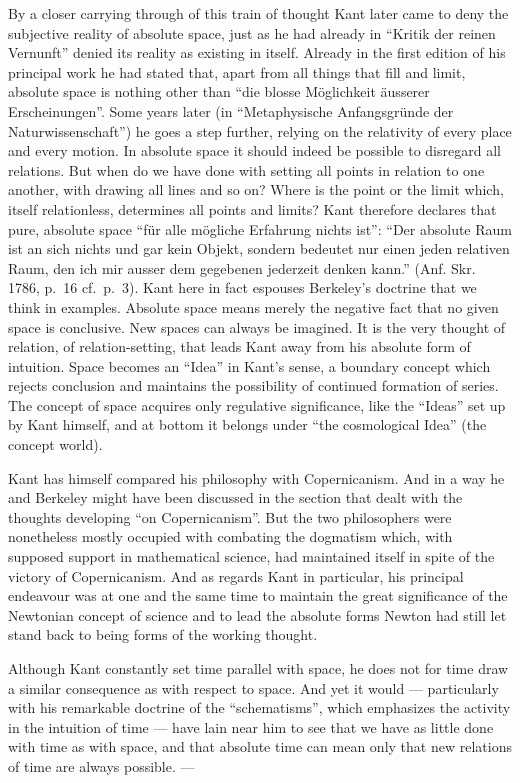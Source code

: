 \documentclass[12pt]{article}
\newcommand{\opage}[1]{\marginnote{\footnotesize\textit{[#1]}}}
\begin{document}
By a closer carrying through of this train of thought Kant later came to
deny the subjective reality of absolute space, just as he had already in
``Kritik der reinen Vernunft'' denied its reality as existing in itself.
Already in the first edition of his principal work he had stated that, apart
from all things that fill and limit, absolute space is nothing other than
``die blosse Möglichkeit äusserer Erscheinungen''. Some years later (in
``Metaphysische Anfangsgründe der Naturwissenschaft'') he goes a step
further, relying on the relativity of every place and every motion. In
absolute space it should indeed be possible to disregard all relations. But
when do we have done with setting all points in relation to one another,
with drawing all lines and so on? Where is the point or the limit which,
itself relationless, determines all points and limits? Kant therefore
declares that pure, absolute space ``für alle mögliche Erfahrung nichts
ist'': ``Der absolute Raum ist an sich nichts und gar kein Objekt, sondern
bedeutet nur einen jeden relativen Raum, den ich mir ausser dem gegebenen
jederzeit denken kann.'' (Anf. Skr. 1786, p.~16 cf.\ p.~3). Kant here in
fact espouses Berkeley's doctrine that we think in examples. Absolute space
means merely the negative fact that no given space is conclusive. New spaces
can always be imagined. It is the very thought of relation, of
relation-setting, that leads Kant away from his absolute form of intuition.
Space becomes an ``Idea'' in Kant's sense, a boundary \opage{71}concept which rejects
conclusion and maintains the possibility of continued formation of series.
The concept of space acquires only regulative significance, like the
``Ideas'' set up by Kant himself, and at bottom it belongs under ``the
cosmological Idea'' (the concept world).

Kant has himself compared his philosophy with Copernicanism. And in a way he
and Berkeley might have been discussed in the section that dealt with the
thoughts developing ``on Copernicanism''. But the two philosophers were
nonetheless mostly occupied with combating the dogmatism which, with
supposed support in mathematical science, had maintained itself in spite of
the victory of Copernicanism. And as regards Kant in particular, his
principal endeavour was at one and the same time to maintain the great
significance of the Newtonian concept of science and to lead the absolute
forms Newton had still let stand back to being forms of the working thought.

Although Kant constantly set time parallel with space, he does not for time
draw a similar consequence as with respect to space. And yet it would ---
particularly with his remarkable doctrine of the ``schematisms'', which
emphasizes the activity in the intuition of time --- have lain near him to
see that we have as little done with time as with space, and that absolute
time can mean only that new relations of time are always possible. ---
\end{document}

